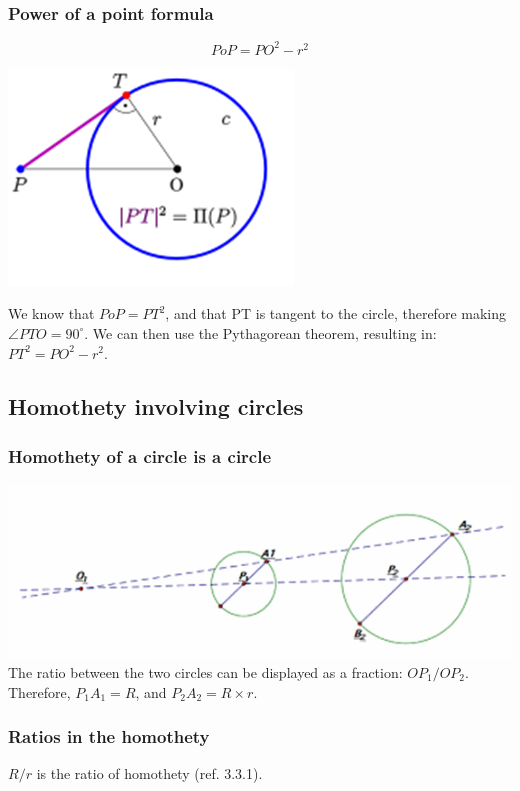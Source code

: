 \documentclass{article}
\begin{document}
\subsubsection{Power of a point formula}

\[PoP = {PO}^2-r^2\]

\begin{center}
\includegraphics{Picture14.png}
\end{center}
We know that $PoP=PT^2$, and that PT is tangent to the circle, therefore making $\angle PTO=90^\circ$. We can then use the Pythagorean theorem, resulting in: $PT^2=PO^2-r^2$.
\vspace{60px}

\subsection{Homothety involving circles}

\subsubsection{Homothety of a circle is a circle}

\includegraphics{Picture15.png}
\\
The ratio between the two circles can be displayed as a fraction: $OP_1/OP_2$. Therefore, $P_1A_1=R$, and $P_2A_2=R\times r$. 
\subsubsection{Ratios in the homothety}
$R/r$ is the ratio of homothety (ref. 3.3.1).
\pagebreak
\end{document}
